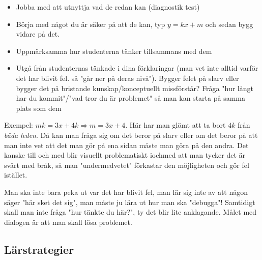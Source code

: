 \begin{itemize}
  \item Jobba med att utnyttja vad de redan kan (diagnostik test)
  \item Börja med något du är säker på att de kan, typ $y = kx+m$ och sedan bygg vidare på det. 
  \item Uppmärksamma hur studenterna tänker tillsammans med dem
  \item Utgå från studenternas tänkade i dina förklaringar (man vet inte alltid varför det har blivit fel. så "går ner på deras nivå"). Bygger felet på slarv eller bygger det på bristande kunskap/konceptuellt missförstår? Fråga "hur långt har du kommit"/"vad tror du är problemet" så man kan starta på samma plats som dem
\end{itemize}
\par\bigskip
\noindent Exempel: $mk=3x+4k\Rightarrow m=3x+4$. Här har man glömt att ta bort $4k$ från \textit{båda leden}. Då kan man fråga sig om det beror på slarv eller om det beror på att man inte vet att det man gör på ena sidan måste man göra på den andra. Det kanske till och med blir visuellt problematiskt iochmed att man tycker det är svårt med bråk, så man "undermedvetet" förkastar den möjligheten och gör fel istället.
\par\bigskip
\noindent Man ska inte bara peka ut var det har blivit fel, man lär sig inte av att någon säger "här sket det sig", man måste ju lära ut hur man ska "debugga"! Samtidigt skall man inte fråga "hur tänkte du här?", ty det blir lite anklagande. Målet med dialogen är att man skall lösa problemet.

\subsection{Lärstrategier}\hfill\\

